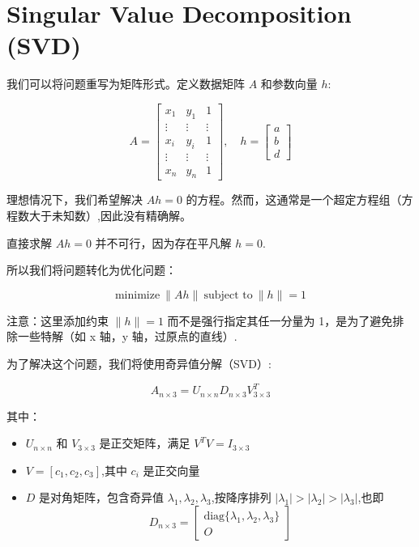 \section{Singular Value Decomposition (SVD)}

我们可以将问题重写为矩阵形式。定义数据矩阵 $A$ 和参数向量 $h$:

$$
A = \begin{bmatrix}
x_1 & y_1 & 1 \\
\vdots & \vdots & \vdots \\
x_i & y_i & 1 \\
\vdots & \vdots & \vdots \\
x_n & y_n & 1
\end{bmatrix}, \quad
h = \begin{bmatrix}
a \\
b \\
d
\end{bmatrix}
$$

理想情况下，我们希望解决 $Ah = 0$ 的方程。然而，这通常是一个超定方程组（方程数大于未知数）,因此没有精确解。

直接求解 $Ah = 0$ 并不可行，因为存在平凡解 $h = 0$.

所以我们将问题转化为优化问题：

\begin{equation}
    \text{minimize} \: \|Ah\| \: \text{subject to} \: \|h\| = 1
\end{equation}

注意：这里添加约束 $\|h\| = 1$ 而不是强行指定其任一分量为 1，是为了避免排除一些特解（如 x 轴，y 轴，过原点的直线）.

为了解决这个问题，我们将使用奇异值分解（SVD）:

$$
A_{n \times 3} = U_{n \times n} D_{n \times 3} V^T_{3 \times 3}
$$

其中：

\begin{itemize}
    \item $U_{n \times n}$ 和 $V_{3 \times 3}$ 是正交矩阵，满足 $V^T V = I_{3 \times 3}$
    \item $V = [c_1, c_2, c_3]$,其中 $c_i$ 是正交向量
    \item $D$ 是对角矩阵，包含奇异值 $\lambda_1, \lambda_2, \lambda_3$,按降序排列 $|\lambda_1| > |\lambda_2| > |\lambda_3|$,也即
    $$
    D_{n \times 3} = \begin{bmatrix}
    \text{diag}\{\lambda_1, \lambda_2, \lambda_3\} \\
    O
    \end{bmatrix}
    $$
\end{itemize}

